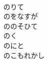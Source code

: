 \documentclass[10pt,b5j]{tarticle} %
\begin{document}
\begin{enumerate}
\begin{minipage}[c]{\blocksize}
        \vspace{\linespace}
        \item~\\
        のりて\\
        のをなすが\\
        ののそひて\\
        のく\\
        のにと\\
        のこもれかし
    
    \end{minipage}
\end{enumerate} %
\end{document}

